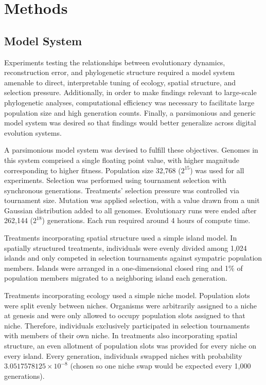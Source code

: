 \section{Methods} \label{sec:methods}

\subsection{Model System}

Experiments testing the relationships between evolutionary dynamics, reconstruction error, and phylogenetic structure required a model system amenable to direct, interpretable tuning of ecology, spatial structure, and selection pressure.
Additionally, in order to make findings relevant to large-scale phylogenetic analyses, computational efficiency was necessary to facilitate large population size and high generation counts.
Finally, a parsimonious and generic model system was desired so that findings would better generalize across digital evolution systems.   

A parsimonious model system was devised to fulfill these objectives.
Genomes in this system comprised a single floating point value, with higher magnitude corresponding to higher fitness.
Population size 32,768 ($2^{15}$) was used for all experiments.
Selection was performed using tournament selection with synchronous generations.
Treatments' selection pressure was controlled via tournament size. 
Mutation was applied selection, with a value drawn from a unit Gaussian distribution added to all genomes.
Evolutionary runs were ended after 262,144 ($2^{18}$) generations.
Each run required around 4 hours of compute time.

Treatments incorporating spatial structure used a simple island model.
In spatially structured treatments, individuals were evenly divided among 1,024 islands and only competed in selection tournaments against sympatric population members.
Islands were arranged in a one-dimensional closed ring and 1\% of population members migrated to a neighboring island each generation.

Treatments incorporating ecology used a simple niche model.
Population slots were split evenly between niches. 
Organisms were arbitrarily assigned to a niche at genesis and were only allowed to occupy population slots assigned to that niche.
Therefore, individuals exclusively participated in selection tournaments with members of their own niche.
In treatments also incorporating spatial structure, an even allotment of population slots was provided for every niche on every island.
Every generation, individuals swapped niches with probability $3.0517578125 \times 10^{-8}$ (chosen so one niche swap would be expected every 1,000 generations). 

